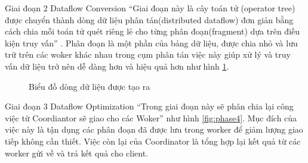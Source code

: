 \documentclass{article}[14pt]
\begin{document}
{Giai đoạn 2 Dataflow Conversion 
“Giai đoạn này là cây toán tử (operator tree) được chuyển thành dòng dữ liệu phân tán(distributed dataflow) đơn giản bằng cách chia mỗi toán tử quét riêng lẻ cho từng phân đoạn(fragment) dựa trên điều kiện truy vấn” \cite{arnold2019hrdbms}. Phân đoạn là một phần của bảng dữ liệu, được chia nhỏ và lưu trữ trên các woker khác nhau trong cụm phân tán việc này giúp xử lý và truy vấn dữ liệu trở nên dễ dàng hơn và hiệu quả hơn như hình \ref{fig:phase3}. 

\begin{figure}[htbp]
\centering
{}
\captionsetup{font=Large}
\caption{Biểu đồ dòng dữ liệu được tạo ra \cite{arnold2019hrdbms}}
\label{fig:phase3}
\end{figure}

Giai đoạn 3 Dataflow Optimization 
“Trong giai đoạn này sẽ phân chia lại công việc từ Coordiantor sẽ giao cho các Woker” như hình \ref{fig:phase4}. Mục đích của việc này là tận dụng các phân đoạn đã được lưu trong worker để giảm lượng giao tiếp không cần thiết. Việc còn lại của Coordinator là tổng hợp lại kết quả từ các worker gửi về và trả kết quả cho client.


}
\end{document}
